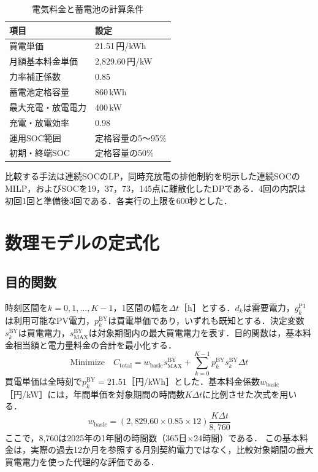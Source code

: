 \documentclass[a4paper,11pt,xelatex,ja=standard]{bxjsarticle}
\begin{document}
\begin{table}[htbp]
    \centering
    \caption{電気料金と蓄電池の計算条件}
    \label{tab:system-conditions}
    \begin{tabular}{p{50mm}p{103mm}}
        \toprule
        項目        & 設定             \\
        \midrule
        買電単価      & 21.51\,円/kWh   \\
        月額基本料金単価  & 2,829.60\,円/kW \\
        力率補正係数    & 0.85           \\
        蓄電池定格容量   & 860\,kWh       \\
        最大充電・放電電力 & 400\,kW        \\
        充電・放電効率   & 0.98           \\
        運用SOC範囲   & 定格容量の5～95\%    \\
        初期・終端SOC  & 定格容量の50\%      \\
        \bottomrule
    \end{tabular}
\end{table}

比較する手法は連続SOCのLP，同時充放電の排他制約を明示した連続SOCのMILP，およびSOCを19，37，73，145点に離散化したDPである．4回の内訳は初回1回と準備後3回である．各実行の上限を600秒とした．

\section{数理モデルの定式化}
\subsection{目的関数}
時刻区間を$k=0,1,\ldots,K-1$，1区間の幅を$\Delta t$［h］とする．$d_k$は需要電力，$g^{\mathrm{P1}}_k$は利用可能なPV電力，$p^{\mathrm{BY}}_k$は買電単価であり，いずれも既知とする．決定変数$s^{\mathrm{BY}}_k$は買電電力，$s^{\mathrm{BY}}_{\mathrm{MAX}}$は対象期間内の最大買電電力を表す．目的関数は，基本料金相当額と電力量料金の合計を最小化する．
\begin{equation}
    \text{Minimize}\quad C_{\mathrm{total}}
    = w_{\mathrm{basic}}s^{\mathrm{BY}}_{\mathrm{MAX}}
    + \sum_{k=0}^{K-1}p^{\mathrm{BY}}_k s^{\mathrm{BY}}_k\Delta t
    \label{eq:objective}
\end{equation}
買電単価は全時刻で$p^{\mathrm{BY}}_k=21.51$［円/kWh］とした．基本料金係数$w_{\mathrm{basic}}$［円/kW］には，年間単価を対象期間の時間数$K\Delta t$に比例させた次式を用いる．
\begin{equation}
    w_{\mathrm{basic}}
    = (2{,}829.60\times0.85\times12)
    \frac{K\Delta t}{8{,}760}
    \label{eq:basic-weight}
\end{equation}
ここで，8,760は2025年の1年間の時間数（365日$\times$24時間）である．
この基本料金は，実際の過去12か月を参照する月別契約電力ではなく，比較対象期間の最大買電電力を使った代理的な評価である．
\end{document}
